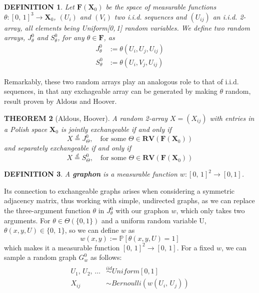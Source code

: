 \documentclass[12pt]{report}
\newtheorem{theorem}{THEOREM}
\newtheorem{definition}[theorem]{DEFINITION}
\newcommand{\bs}{\boldsymbol}
\newcommand{\mb}[1]{\mathbb{#1}}
\renewcommand{\bs}{\boldsymbol}
\begin{document}
\begin{definition}
    Let $\bs{F}(\bs{X}_0)$ be the space of measurable functions $\theta : [0,\,1]^3 \rightarrow \bs{X}_0$, $(U_i)$ and $(V_i)$ two i.i.d. sequences and $(U_{ij})$ an i.i.d. 2-array, all elements being Uniform[0,\,1] random variables. We define two random arrays, $J_\theta^0$ and $S_\theta^0$, for any $\theta \in \bs{F}$, as
    \begin{align}
        J_\theta^0 &:= \theta(U_i, U_j, U_{ij}) \\
        S_\theta^0 &:= \theta(U_i, V_j, U_{ij})
    \end{align}
\end{definition}

Remarkably, these two random arrays play an analogous role to that of i.i.d. sequences, in that any exchageable array can be generated by making $\theta$ random, result proven by Aldous and Hoover. \\

\begin{theorem}[Aldous, Hoover]
    A random 2-array $X = (X_{ij})$ with entries in a Polish space $\bs{X}_0$ is jointly exchangeable if and only if
    \begin{equation}
        X \overset{d}{=} J_\Theta^0,\quad \text{for some}\,\, \Theta \in \bs{RV}(\bs{F}(\bs{X}_0))
    \end{equation}
and separately exchangeable if and only if
    \begin{equation}
        X \overset{d}{=} S_\Theta^0,\quad \text{for some}\,\, \Theta \in \bs{RV}(\bs{F}(\bs{X}_0))
    \end{equation}
\end{theorem}

\begin{definition}
    A \textbf{graphon} is a measurable function $w : [0,\,1]^2 \rightarrow [0, 1]$.
\end{definition}

Its connection to exchangeable graphs arises when considering a symmetric adjacency matrix, thus working with simple, undirected graphs, as we can replace the three-argument function $\theta$ in $J_\theta^0$ with our graphon $w$, which only takes two arguments. For $\theta \in \Theta(\{0, 1\})$ and a uniform random variable U, $\theta(x, y, U) \in \{0,\,1\}$, so we can define $w$ as
\begin{equation}
    w(x, y) := \mb{P}[\theta(x, y, U) = 1]
\end{equation}
which makes it a measurable function $[0,\,1]^2 \rightarrow [0,\,1]$. For a fixed $w$, we can sample a random graph $G_w^0$ as follows:
\begin{align}
    \label{graphon_sample}
\begin{split}
    U_1,\,U_2,\,\dots &\overset{iid}{\sim} Uniform[0, 1] \\
    X_{ij} &\sim Bernoulli(w(U_i,\,U_j))
\end{split}
\end{align}
\end{document}
